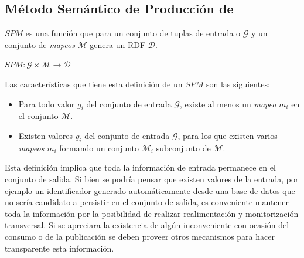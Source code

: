 \subsection{Método Semántico de Producción de \linkeddata}\label{method-prod-def}
\begin{definition}
$SPM$ es una función que para un conjunto de tuplas de entrada o \dataset $\mathcal{G}$ y un conjunto de \textit{mapeos} $\mathcal{M}$  
genera un \dataset RDF $\mathcal{D}$.
\end{definition}

\begin{center}
    $SPM : \mathcal{G} \times \mathcal{M} \longrightarrow \mathcal{D}$
\end{center}
Las características que tiene esta definición de un $SPM$ son las siguientes:
\begin{itemize}
 \item Para todo valor $g_{i}$ del conjunto de entrada $\mathcal{G}$, existe al menos un
\textit{mapeo} $m_{i}$ en el conjunto $\mathcal{M}$.
 \item Existen valores $g_{i}$ del conjunto de entrada $\mathcal{G}$, para los que existen
varios \textit{mapeos} $m_{i}$ formando un conjunto $\mathcal{M}_{i}$ subconjunto de $\mathcal{M}$.
\end{itemize}

Esta definición implica que toda la información de entrada permanece en el conjunto de salida. Si bien
se podría pensar que existen valores de la entrada, por ejemplo un identificador generado automáticamente desde
una base de datos que no sería candidato a persistir en el conjunto de salida, es conveniente mantener
toda la información por la posibilidad de realizar realimentación y monitorización transversal. Si se apreciara 
la existencia de algún inconveniente con ocasión del consumo o de la publicación se deben proveer otros mecanismos para
hacer transparente esta información.

% 



